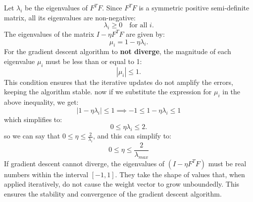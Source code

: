 \begin{qsolve}
	\begin{qsolve}[]
		Let \( \lambda_i \) be the eigenvalues of \( F^T F \). Since \( F^T F \) is a symmetric positive semi-definite matrix, all its eigenvalues are non-negative:
		$$
		\lambda_i \geq 0 \quad \text{for all } i.
		$$
		The eigenvalues of the matrix \( I - \eta F^T F \) are given by:
		$$
		\mu_i = 1 - \eta \lambda_i.
		$$
		For the gradient descent algorithm to \textbf{not diverge}, the magnitude of each eigenvalue \( \mu_i \) must be less than or equal to 1:
		\splitqsolve[\splitqsolve]
		$$
		| \mu_i | \leq 1.
		$$
		This condition ensures that the iterative updates do not amplify the errors, keeping the algorithm stable. now if we substitute the expression for \( \mu_i \) in the above inequality, we get:
		$$
		|1 - \eta \lambda_i| \leq 1 \implies -1 \leq 1 - \eta \lambda_i \leq 1
		$$
		which simplifies to:
		$$
		0 \leq \eta \lambda_i \leq 2.
		$$
		so we can say that $0 \leq \eta \leq \frac{2}{\lambda_i}$, and this can simplify to:
		$$
		0 \leq \eta \leq \frac{2}{\lambda_{max}}
		$$
		If gradient descent cannot diverge, the eigenvalues of \( (I - \eta F^T F) \) must be real numbers within the interval \( [ -1, 1 ] \). They take the shape of values that, when applied iteratively, do not cause the weight vector to grow unboundedly. This ensures the stability and convergence of the gradient descent algorithm.
	\end{qsolve}
\end{qsolve}